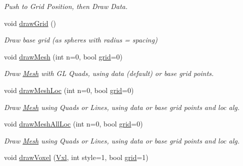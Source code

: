 \begin{DoxyCompactItemize}
\begin{DoxyCompactList}\small\item\em Push to Grid Position, then Draw Data. \end{DoxyCompactList}\item 
\hypertarget{classvsr_1_1_lattice_ad1c4aa3ec54921702dc1012db1e7951e}{void \hyperlink{classvsr_1_1_lattice_ad1c4aa3ec54921702dc1012db1e7951e}{draw\-Grid} ()}\label{classvsr_1_1_lattice_ad1c4aa3ec54921702dc1012db1e7951e}

\begin{DoxyCompactList}\small\item\em Draw base grid (as spheres with radius = spacing) \end{DoxyCompactList}\item 
\hypertarget{classvsr_1_1_lattice_a8fb5d84983c6b710a742b6cea16b31b8}{void \hyperlink{classvsr_1_1_lattice_a8fb5d84983c6b710a742b6cea16b31b8}{draw\-Mesh} (int n=0, bool \hyperlink{classvsr_1_1_lattice_a85532086719166cc74662088b0173a4c}{grid}=0)}\label{classvsr_1_1_lattice_a8fb5d84983c6b710a742b6cea16b31b8}

\begin{DoxyCompactList}\small\item\em Draw \hyperlink{structvsr_1_1_mesh}{Mesh} with G\-L Quads, using data (default) or base grid points. \end{DoxyCompactList}\item 
\hypertarget{classvsr_1_1_lattice_a054b3c59319b99f160efb595367595a4}{void \hyperlink{classvsr_1_1_lattice_a054b3c59319b99f160efb595367595a4}{draw\-Mesh\-Loc} (int n=0, bool \hyperlink{classvsr_1_1_lattice_a85532086719166cc74662088b0173a4c}{grid}=0)}\label{classvsr_1_1_lattice_a054b3c59319b99f160efb595367595a4}

\begin{DoxyCompactList}\small\item\em Draw \hyperlink{structvsr_1_1_mesh}{Mesh} using Quads or Lines, using data or base grid points and loc alg. \end{DoxyCompactList}\item 
\hypertarget{classvsr_1_1_lattice_a4e199b8dad247f5b5c6a316195c23567}{void \hyperlink{classvsr_1_1_lattice_a4e199b8dad247f5b5c6a316195c23567}{draw\-Mesh\-All\-Loc} (int n=0, bool \hyperlink{classvsr_1_1_lattice_a85532086719166cc74662088b0173a4c}{grid}=0)}\label{classvsr_1_1_lattice_a4e199b8dad247f5b5c6a316195c23567}

\begin{DoxyCompactList}\small\item\em Draw \hyperlink{structvsr_1_1_mesh}{Mesh} using Quads or Lines, using data or base grid points and loc alg. \end{DoxyCompactList}\item 
\hypertarget{classvsr_1_1_lattice_ab6435dc47e3d459bd159ffc6101831c4}{void \hyperlink{classvsr_1_1_lattice_ab6435dc47e3d459bd159ffc6101831c4}{draw\-Voxel} (\hyperlink{classvsr_1_1_vxl}{Vxl}, int style=1, bool \hyperlink{classvsr_1_1_lattice_a85532086719166cc74662088b0173a4c}{grid}=1)}\label{classvsr_1_1_lattice_ab6435dc47e3d459bd159ffc6101831c4}


\end{DoxyCompactItemize}
